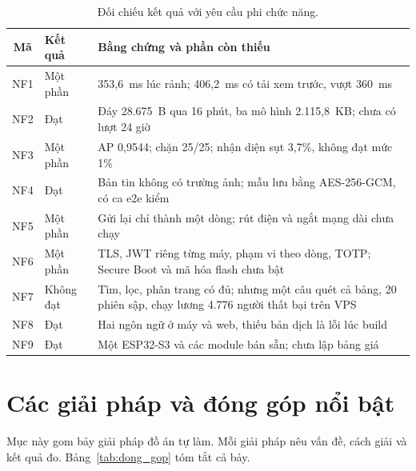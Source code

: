 \documentclass[../DoAn.tex]{subfiles}
\begin{document}
\begin{table}[!htb]
\centering
\small
\caption{Đối chiếu kết quả với yêu cầu phi chức năng.}
\label{tab:doi_chieu_nf}
\begin{tabular}{|c|L{1.9cm}|L{11.0cm}|}
\hline
\textbf{Mã} & \textbf{Kết quả} & \textbf{Bằng chứng và phần còn thiếu} \\
\hline
NF1 & Một phần & 353,6~ms lúc rảnh; 406,2~ms có tải xem trước, vượt 360~ms \\
\hline
NF2 & Đạt & Đáy 28.675~B qua 16 phút, ba mô hình 2.115,8~KB; chưa có lượt 24 giờ \\
\hline
NF3 & Một phần & AP 0,9544; chặn 25/25; nhận diện sụt 3,7\%, không đạt mức 1\% \\
\hline
NF4 & Đạt & Bản tin không có trường ảnh; mẫu lưu bằng AES-256-GCM, có ca e2e kiểm \\
\hline
NF5 & Một phần & Gửi lại chỉ thành một dòng; rút điện và ngắt mạng dài chưa chạy \\
\hline
NF6 & Một phần & TLS, JWT riêng từng máy, phạm vi theo dòng, TOTP; Secure Boot và mã hóa flash chưa bật \\
\hline
NF7 & Không đạt & Tìm, lọc, phân trang có đủ; nhưng một câu quét cả bảng, 20 phiên sập, chạy lương 4.776 người thất bại trên VPS \\
\hline
NF8 & Đạt & Hai ngôn ngữ ở máy và web, thiếu bản dịch là lỗi lúc build \\
\hline
NF9 & Đạt & Một ESP32-S3 và các module bán sẵn; chưa lập bảng giá \\
\hline
\end{tabular}
\end{table}

\clearpage
\section{Các giải pháp và đóng góp nổi bật}
\label{section:5.8}

Mục này gom bảy giải pháp đồ án tự làm. Mỗi giải pháp nêu vấn đề, cách giải và kết quả đo. Bảng~\ref{tab:dong_gop} tóm tắt cả bảy.
\end{document}
